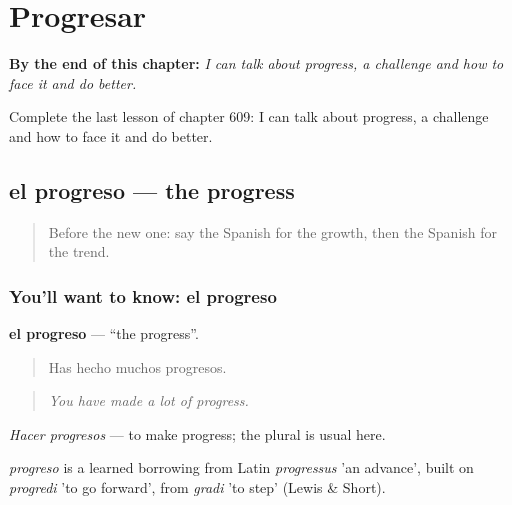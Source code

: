 
\chapter{Progresar}
\label{ch:es-progresar}

\begin{chapteropening}
\textbf{By the end of this chapter:} \emph{I can talk about progress, a challenge and how to face it and do better.}

Complete the last lesson of chapter 609: I can talk about progress, a challenge and how to face it and do better.
\end{chapteropening}

\section[el progreso]{el progreso — the progress}

\label{lesson:ES-C609-progreso}



\begin{quote}
Before the new one: say the Spanish for the growth, then the Spanish for the trend.
\end{quote}

\subsection*{You'll want to know: el progreso}
\textbf{el progreso} — \textquotedblleft{}the progress\textquotedblright{}.

\begin{quote}
Has hecho muchos progresos.
\end{quote}

\begin{quote}
\emph{You have made a lot of progress.}
\end{quote}

\emph{Hacer progresos} — to make progress; the plural is usual here.

\begin{cousinweb}
\emph{progreso} is a learned borrowing from Latin \emph{progressus} 'an advance', built on \emph{progredi} 'to go forward', from \emph{gradi} 'to step' (Lewis \& Short).
\end{cousinweb}

